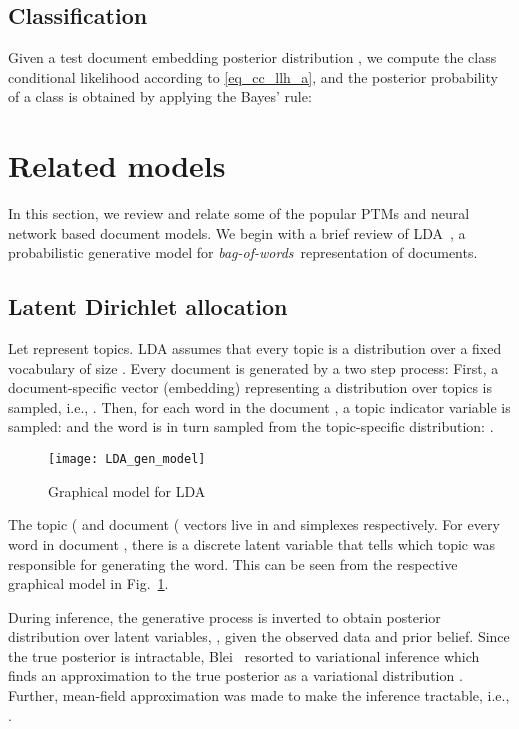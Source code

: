 \documentclass[journal]{IEEEtran}
\newcommand{\bow}{\textit{bag-of-words}}
\begin{document}
\subsection{Classification}
\label{ssec:gc_pred}
Given a test document embedding posterior distribution , we compute the class 
conditional likelihood according to \eqref{eq_cc_llh_a}, and the posterior 
probability of a class  is obtained by applying the Bayes' 
rule:



\section{Related models}
\label{sec:related_models}
In this section, we review and relate some of the popular PTMs and neural network based document models. We begin with a brief review of LDA~\cite{Blei:2003:LDA}, a probabilistic generative model for \bow~representation of documents.

\subsection{Latent Dirichlet allocation}
Let  represent  topics. LDA assumes that every topic 
 is a distribution over a fixed vocabulary of size . Every
document  is generated by a two step process:
First, a document-specific vector (embedding) representing a distribution over 
 topics is sampled, i.e., . 
Then, for each word in the document , a topic indicator variable
 is sampled:  and the 
word  is in turn sampled from the topic-specific distribution: .

\begin{figure}[t!]
	\centering
	\texttt{[image: LDA\_gen\_model]}
	\caption{Graphical model for LDA} \label{fig:lda}
\end{figure}
The topic ( and document ( vectors live in  and  simplexes respectively. For every word  in document , there is a discrete latent variable  that tells which topic was responsible for generating the word. This can be seen from the respective graphical model in Fig.~\ref{fig:lda}.


During inference, the generative process is inverted to obtain posterior 
distribution over latent variables, , given the observed data and prior 
belief.
Since the true posterior is intractable, Blei~\cite{Blei:2003:LDA} resorted to 
variational inference which finds an approximation to the true posterior as a 
variational distribution . Further, mean-field 
approximation was made to make the inference tractable, i.e., .
\end{document}
